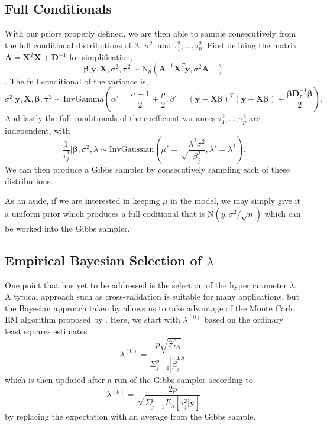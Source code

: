 \documentclass{uwstat572}
\begin{document}
\subsection{Full Conditionals}
With our priors properly defined, we are then able to sample consecutively from the full conditional distributions of $\boldsymbol\beta$, $\sigma^2$, and $\tau^2_1,...,\tau^2_p$. First defining the matrix $\mathbf{A}=\mathbf{X}^T\mathbf{X}+\mathbf{D}_\tau^{-1}$ for simplification, \[
\boldsymbol\beta|\mathbf{y},\mathbf{X},\sigma^2,\boldsymbol\tau^2 \sim \text{N}_p(\mathbf{A}^{-1}\mathbf{X}^T\mathbf{y},\sigma^2\mathbf{A}^{-1}) \]. The full conditional of the variance is, \[ \sigma^2|\mathbf{y},\mathbf{X},\boldsymbol\beta,\boldsymbol\tau^2 \sim \text{InvGamma}\left(\alpha'=\frac{n-1}{2}+\frac{p}{2},\beta'=(\mathbf{y}-\mathbf{X}\boldsymbol\beta)^T(\mathbf{y}-\mathbf{X}\boldsymbol\beta)+\frac{\boldsymbol\beta\mathbf{D}_\tau^{-1}\boldsymbol\beta}{2}\right). \] And lastly the full conditionals of the coefficient variances $\tau^2_1,...,\tau^2_p$ are independent, with \[
\frac{1}{\tau_j^2} | \boldsymbol\beta, \sigma^2, \lambda \sim \text{InvGaussian}\left(\mu'=\sqrt\frac{\lambda^2\sigma^2}{\beta_j^2}, \lambda'=\lambda^2\right). \] We can then produce a Gibbs sampler by consecutively sampling each of these distributions.

As an aside, if we are interested in keeping $\mu$ in the model, we may simply give it a uniform prior which produces a full coditional that is $\text{N}(\bar{y},\sigma^2/\sqrt{n})$ which can be worked into the Gibbs sampler.

\subsection{Empirical Bayesian Selection of $\lambda$}
One point that has yet to be addressed is the selection of the hyperparameter $\lambda$. A typical approach such as cross-validation is suitable for many applications, but the Bayesian approach taken by \cite{park2008bayesian} allows us to take advantage of the Monte Carlo EM algorithm proposed by \cite{casella2001empirical}. Here, we start with $\lambda^{(0)}$ based on the ordinary least squares estimates \[ 
\lambda^{(0)}=\frac{p\sqrt{\hat\sigma^2_{LS}}}{\Sigma^p_{j=1}|\hat\beta_j^{LS}|} 
\] which is then updated after a run of the Gibbs sampler according to \[ 
\lambda^{(k)}=\sqrt\frac{2p}{\Sigma^p_{j=1}E_\lambda[\tau^2_j|\mathbf{y}]}
\] by replacing the expectation with an average from the Gibbs sample. 
\end{document}

